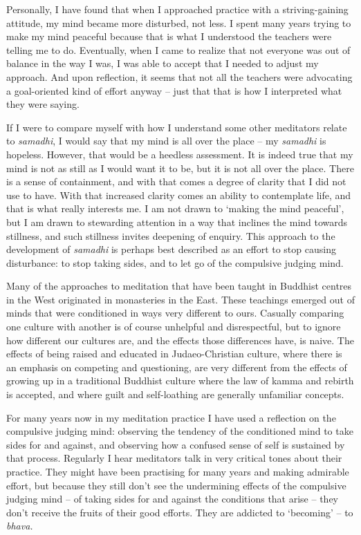 Personally, I have found that when I approached practice with a
striving-gaining attitude, my mind became more disturbed, not less. I
spent many years trying to make my mind peaceful because that is what I
understood the teachers were telling me to do. Eventually, when I came
to realize that not everyone was out of balance in the way I was, I was
able to accept that I needed to adjust my approach. And upon reflection,
it seems that not all the teachers were advocating a goal-oriented kind
of effort anyway -- just that that is how I interpreted what they were
saying.

If I were to compare myself with how I understand some other meditators
relate to \emph{samadhi}, I would say that my mind is all over the place
-- my \emph{samadhi} is hopeless. However, that would be a heedless
assessment. It is indeed true that my mind is not as still as I would
want it to be, but it is not all over the place. There is a sense of
containment, and with that comes a degree of clarity that I did not use
to have. With that increased clarity comes an ability to contemplate
life, and that is what really interests me. I am not drawn to `making
the mind peaceful', but I am drawn to stewarding attention in a way that
inclines the mind towards stillness, and such stillness invites
deepening of enquiry. This approach to the development of \emph{samadhi}
is perhaps best described as an effort to stop causing disturbance: to
stop taking sides, and to let go of the compulsive judging mind.

Many of the approaches to meditation that have been taught in Buddhist
centres in the West originated in monasteries in the East. These
teachings emerged out of minds that were conditioned in ways very
different to ours. Casually comparing one culture with another is of
course unhelpful and disrespectful, but to ignore how different our
cultures are, and the effects those differences have, is naive. The
effects of being raised and educated in Judaeo-Christian culture, where
there is an emphasis on competing and questioning, are very different
from the effects of growing up in a traditional Buddhist culture where
the law of kamma and rebirth is accepted, and where guilt and
self-loathing are generally unfamiliar concepts.

For many years now in my meditation practice I have used a reflection on
the compulsive judging mind: observing the tendency of the conditioned
mind to take sides for and against, and observing how a confused sense
of self is sustained by that process. Regularly I hear meditators talk
in very critical tones about their practice. They might have been
practising for many years and making admirable effort, but because they
still don't see the undermining effects of the compulsive judging mind
-- of taking sides for and against the conditions that arise -- they
don't receive the fruits of their good efforts. They are addicted to
`becoming' -- to \emph{bhava.}

